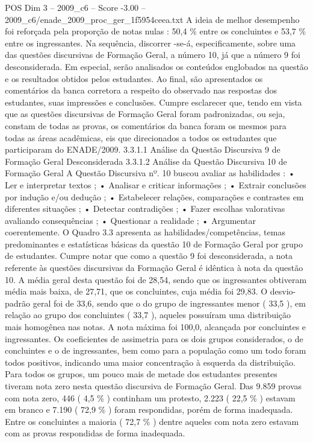 \begin{textsample}{POS Dim 3 – 2009\_c6 – Score -3.00 – 2009\_c6/enade\_2009\_proc\_ger\_1f5954ceea.txt}
A ideia de melhor desempenho foi reforçada pela proporção de notas nulas : 50,4 \% entre os concluintes e 53,7 \% entre os ingressantes.
Na sequência, discorrer -se-á, especificamente, sobre uma das questões discursivas de Formação Geral, a número 10, já que a número 9 foi desconsiderada.
Em especial, serão analisados os conteúdos englobados na questão e os resultados obtidos pelos estudantes.
Ao final, são apresentados os comentários da banca corretora a respeito do observado nas respostas dos estudantes, suas impressões e conclusões.
Cumpre esclarecer que, tendo em vista que as questões discursivas de Formação Geral foram padronizadas, ou seja, constam de todas as provas, os comentários da banca foram os mesmos para todas as áreas acadêmicas, eis que direcionados a todos os estudantes que participaram do ENADE/2009. 3.3.1.1 Análise da Questão Discursiva 9 de Formação Geral Desconsiderada 3.3.1.2 Análise da Questão Discursiva 10 de Formação Geral A Questão Discursiva nº. 10 buscou avaliar as habilidades : • Ler e interpretar textos ; • Analisar e criticar informações ; • Extrair conclusões por indução e/ou dedução ; • Estabelecer relações, comparações e contrastes em diferentes situações ; • Detectar contradições ; • Fazer escolhas valorativas avaliando consequências ; • Questionar a realidade ; • Argumentar coerentemente.
O Quadro 3.3 apresenta as habilidades/competências, temas predominantes e estatísticas básicas da questão 10 de Formação Geral por grupo de estudantes.
Cumpre notar que como a questão 9 foi desconsiderada, a nota referente às questões discursivas da Formação Geral é idêntica à nota da questão 10.
A média geral desta questão foi de 28,54, sendo que os ingressantes obtiveram média mais baixa, de 27,71, que os concluintes, cuja média foi 29,83.
O desvio-padrão geral foi de 33,6, sendo que o do grupo de ingressantes menor ( 33,5 ), em relação ao grupo dos concluintes ( 33,7 ), aqueles possuíram uma distribuição mais homogênea nas notas.
A nota máxima foi 100,0, alcançada por concluintes e ingressantes.
Os coeficientes de assimetria para os dois grupos considerados, o de concluintes e o de ingressantes, bem como para a população como um todo foram todos positivos, indicando uma maior concentração à esquerda da distribuição.
Para todos os grupos, um pouco mais de metade dos estudantes presentes tiveram nota zero nesta questão discursiva de Formação Geral.
Das 9.859 provas com nota zero, 446 ( 4,5 \% ) continham um protesto, 2.223 ( 22,5 \% ) estavam em branco e 7.190 ( 72,9 \% ) foram respondidas, porém de forma inadequada.
Entre os concluintes a maioria ( 72,7 \% ) dentre aqueles com nota zero estavam com as provas respondidas de forma inadequada.

\end{textsample}
